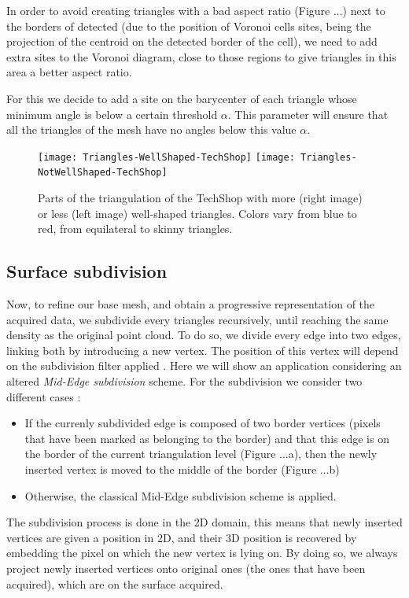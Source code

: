 

In order to avoid creating triangles with a bad aspect ratio (Figure ...) next to the borders of detected (due to the position of Voronoi cells sites, being the projection of the centroid on the detected border of the cell), we need to add extra sites to the Voronoi diagram, close to those regions to give triangles in this area a better aspect ratio.

For this we decide to add a site on the barycenter of each triangle whose minimum angle is below a certain threshold $\alpha$. 
This parameter will ensure that all the triangles of the mesh have no angles below this value $\alpha$.

\begin{figure}[ht]
\centering\texttt{[image: Triangles-WellShaped-TechShop]}
\centering\texttt{[image: Triangles-NotWellShaped-TechShop]}
\caption{Parts of the triangulation of the TechShop with more (right image) or less (left image) well-shaped triangles. 
Colors vary from blue to red, from equilateral to skinny triangles.}
\label{fig:voronoi_diagram_triangulation}
\end{figure}

\subsection{Surface subdivision}

Now, to refine our base mesh, and obtain a progressive representation of the acquired data, we subdivide every triangles recursively, until reaching the same density as the original point cloud.
To do so, we divide every edge into two edges, linking both by introducing a new vertex. The position of this vertex will depend on the subdivision filter applied \cite{PR08}.
Here we will show an application considering an altered \textit{Mid-Edge subdivision} scheme.
For the subdivision we consider two different cases :
\begin{itemize}
	\item If the currenly subdivided edge is composed of two border vertices (pixels that have been marked as belonging to the border) and that this edge is on the border of the current triangulation level (Figure ...a), then the newly inserted vertex is moved to the middle of the border (Figure ...b)
	\item Otherwise, the classical Mid-Edge subdivision scheme is applied.
\end{itemize}

The subdivision process is done in the 2D domain, this means that newly inserted vertices are given a position in 2D, and their 3D position is recovered by embedding the pixel on which the new vertex is lying on.
By doing so, we always project newly inserted vertices onto original ones (the ones that have been acquired), which are on the surface acquired.

